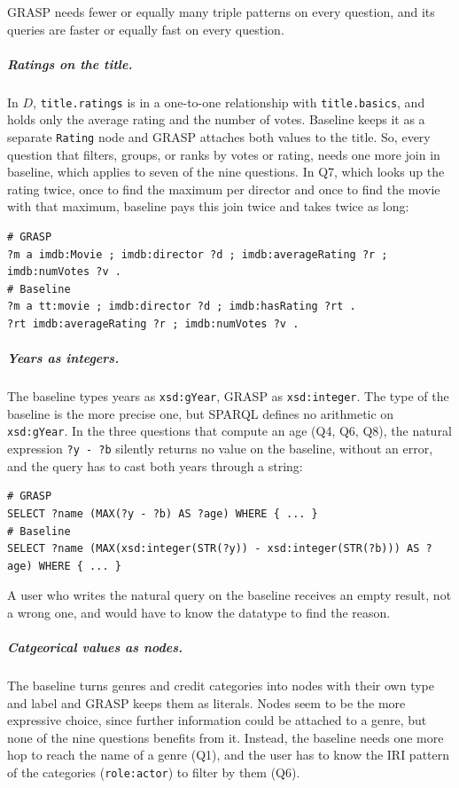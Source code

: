GRASP needs fewer or equally many triple patterns on every question, and its queries are faster or equally fast on every question. 
\subparagraph{Ratings on the title.}
In \(D\), \texttt{title.ratings} is in a one-to-one relationship with \texttt{title.basics}, and holds only the average rating and the number of votes. Baseline keeps it as a separate \texttt{Rating} node and GRASP attaches both values to the title. So, every question that filters, groups, or ranks by votes or rating, needs one more join in baseline, which applies to seven of the nine questions. In Q7, which looks up the rating twice, once to find the maximum per director and once to find the movie with that maximum, baseline pays this join twice and takes twice as long:
\begin{lstlisting}[language=SPARQL, basicstyle=\ttfamily\scriptsize, columns=fixed]
# GRASP
?m a imdb:Movie ; imdb:director ?d ; imdb:averageRating ?r ; imdb:numVotes ?v .
# Baseline
?m a tt:movie ; imdb:director ?d ; imdb:hasRating ?rt .
?rt imdb:averageRating ?r ; imdb:numVotes ?v .
\end{lstlisting}

\subparagraph{Years as integers.}
The baseline types years as \texttt{xsd:gYear}, GRASP as \texttt{xsd:integer}. The type of the baseline is the more precise one, but SPARQL defines no arithmetic on \texttt{xsd:gYear}. In the three questions that compute an age (Q4, Q6, Q8), the natural expression \texttt{?y - ?b} silently returns no value on the baseline, without an error, and the query has to cast both years through a string:
\begin{lstlisting}[language=SPARQL, basicstyle=\ttfamily\scriptsize, columns=fixed]
# GRASP
SELECT ?name (MAX(?y - ?b) AS ?age) WHERE { ... }
# Baseline
SELECT ?name (MAX(xsd:integer(STR(?y)) - xsd:integer(STR(?b))) AS ?age) WHERE { ... }
\end{lstlisting}
A user who writes the natural query on the baseline receives an empty result, not a wrong one, and would have to know the datatype to find the reason.

\subparagraph{Catgeorical values as nodes.}
The baseline turns genres and credit categories into nodes with their own type and label and GRASP keeps them as literals. Nodes seem to be the more expressive choice, since further information could be attached to a genre, but none of the nine questions benefits from it. Instead, the baseline needs one more hop to reach the name of a genre (Q1), and the user has to know the IRI pattern of the categories (\texttt{role:actor}) to filter by them (Q6). 

